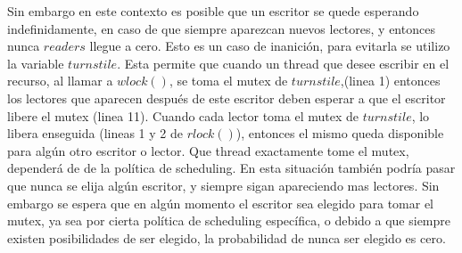 Sin embargo en este contexto es posible que un escritor se quede esperando indefinidamente, en caso de que siempre aparezcan nuevos lectores, y entonces nunca $ readers $ llegue a cero. Esto es un caso de inanición, para evitarla se utilizo la variable $ turnstile $. Esta permite que cuando un thread que desee escribir en el recurso, al llamar a $ wlock() $, se toma el mutex de $ turnstile $,(linea 1) entonces los lectores que aparecen después de este escritor deben esperar a que el escritor libere el mutex (linea 11). Cuando cada lector toma el mutex de $ turnstile $, lo libera enseguida (lineas 1 y 2 de $ rlock() $), entonces el mismo queda disponible para algún otro escritor o lector. Que thread exactamente tome el mutex, dependerá de de la política de scheduling. En esta situación también podría pasar que nunca se elija algún escritor, y siempre sigan apareciendo mas lectores. Sin embargo se espera que en algún momento el escritor sea elegido para tomar el mutex, ya sea por cierta política de scheduling específica, o debido a que siempre existen posibilidades de ser elegido, la probabilidad de nunca ser elegido es cero.
